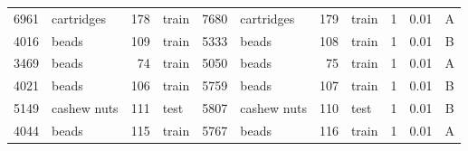\begin{tabular}{clrlclrlrlc}
6961 & cartridges & 178 & train & 7680 & cartridges & 179 & train & 1 & 0.01 & A\\
4016 & beads & 109 & train & 5333 & beads & 108 & train & 1 & 0.01 & B\\
3469 & beads & 74 & train & 5050 & beads & 75 & train & 1 & 0.01 & A\\
4021 & beads & 106 & train & 5759 & beads & 107 & train & 1 & 0.01 & B\\
5149 & cashew nuts & 111 & test & 5807 & cashew nuts & 110 & test & 1 & 0.01 & B\\
4044 & beads & 115 & train & 5767 & beads & 116 & train & 1 & 0.01 & A\\
\bottomrule
\end{tabular}
